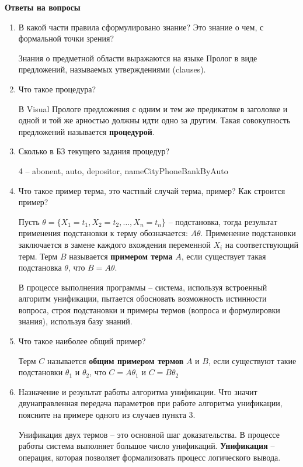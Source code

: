 \documentclass[a4paper,14pt]{extreport} %
\begin{document}
\hfill

\textbf{Ответы на вопросы}

\begin{enumerate} 
\item В какой части правила сформулировано знание? Это знание о чем, с формальной точки зрения?

Знания о предметной области выражаются на языке Пролог в виде предложений, называемых утверждениями (clauses). 

\item Что такое процедура?

В Visual Прологе предложения с одним и тем же предикатом в заголовке и одной и той же арностью должны идти одно за другим. Такая совокупность предложений называется \textbf{процедурой}. 

\item Сколько в БЗ  текущего задания процедур?

4 -- abonent, auto, depositor, nameCityPhoneBankByAuto

\item Что такое пример терма, это частный случай терма, пример? Как строится пример? 

Пусть $\theta = \{ X_1 = t_1, X_2= t_2, … , X_n = t_n \}$ -- подстановка,  тогда результат применения подстановки к терму обозначается: $A\theta$. Применение подстановки заключается в замене каждого вхождения переменной $X_i$  на соответствующий терм. Терм $B$ называется \textbf{примером терма} $A$, если существует такая подстановка $\theta$, что $B=A\theta$.

В процессе выполнения программы -- система, используя встроенный алгоритм унификации, пытается обосновать возможность истинности вопроса, строя подстановки и примеры термов (вопроса и формулировки знания), используя базу знаний. 

\item Что такое наиболее общий пример?

Терм $C$ называется \textbf{общим примером термов} $A$ и $B$, если существуют такие подстановки $\theta_1$ и $\theta_2$, что $C = A\theta_1$  и  $C = B\theta_2$

\item Назначение и результат работы алгоритма унификации. Что значит двунаправленная передача параметров при работе алгоритма унификации, поясните на примере одного из случаев пункта  3.

Унификация двух термов -- это основной шаг доказательства. В процессе работы система выполняет большое число унификаций.
\textbf{Унификация} -- операция, которая позволяет формализовать процесс логического вывода. 


\end{enumerate}
\end{document}

